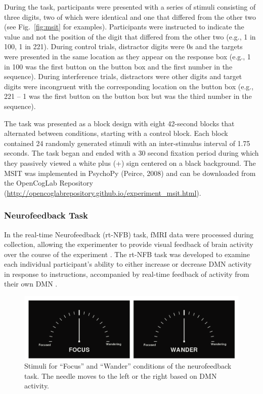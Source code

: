 During the task, participants were presented with a series of stimuli consisting of three digits, two of which were identical and one that differed from the other two (see Fig.~\ref{fig:msit} for examples). Participants were instructed to indicate the value and not the position of the digit that differed from the other two (e.g., 1 in 100, 1 in 221). During control trials, distractor digits were 0s and the targets were presented in the same location as they appear on the response box (e.g., 1 in 100 was the first button on the button box and the first number in the sequence). During interference trials, distractors were other digits and target digits were incongruent with the corresponding location on the button box (e.g., 221 – 1 was the first button on the button box but was the third number in the sequence).

The task was presented as a block design with eight 42-second blocks that alternated between conditions, starting with a control block. Each block contained 24 randomly generated stimuli with an inter-stimulus interval of 1.75 seconds. The task began and ended with a 30 second fixation period during which they passively viewed a white plus (+) sign centered on a black background. The MSIT was implemented in PsychoPy (Peirce, 2008) and can be downloaded from the OpenCogLab Repository (\url{http://opencoglabrepository.github.io/experiment\_msit.html}).

\subsubsection{Neurofeedback Task}

In the real-time Neurofeedback (rt-NFB) task, fMRI data were processed during collection, allowing the experimenter to provide visual feedback of brain activity over the course of the experiment \cite{Cox1995,LaConte2011}. The rt-NFB task was developed to examine each individual participant’s ability to either increase or decrease DMN activity in response to instructions, accompanied by real-time feedback of activity from their own DMN \cite{Craddock2012}.

\begin{figure}[h!]
   \centering
   \includegraphics[width=.9\textwidth]{nfb_stim.png}
   \caption{Stimuli for “Focus” and “Wander” conditions of the neurofeedback task. The needle moves to the left or the right based on DMN activity.}
   \label{fig:nfb}
\end{figure}

